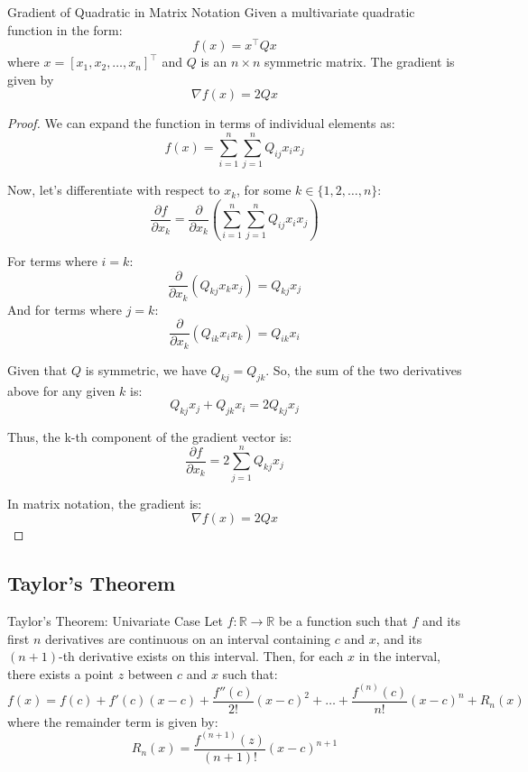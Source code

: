 \begin{lemma}{Gradient of Quadratic in Matrix Notation}{}
Given a multivariate quadratic function in the form:
\[ f(x) = x^\top Q x \]
where \( x = [x_1, x_2, \ldots, x_n]^\top \) and \( Q \) is an \( n \times n \) symmetric matrix. 
The gradient is given by
\[ \nabla f(x) = 2Qx \]

\end{lemma}
\begin{proof}
We can expand the function in terms of individual elements as:
\[ f(x) = \sum_{i=1}^{n} \sum_{j=1}^{n} Q_{ij} x_i x_j \]

Now, let's differentiate with respect to \( x_k \), for some \( k \in \{1, 2, \ldots, n\} \):
\[ \frac{\partial f}{\partial x_k} = \frac{\partial}{\partial x_k} \left( \sum_{i=1}^{n} \sum_{j=1}^{n} Q_{ij} x_i x_j \right) \]

For terms where \( i = k \):
\[ \frac{\partial}{\partial x_k} (Q_{kj} x_k x_j) = Q_{kj} x_j \]
And for terms where \( j = k \):
\[ \frac{\partial}{\partial x_k} (Q_{ik} x_i x_k) = Q_{ik} x_i \]

Given that \( Q \) is symmetric, we have \( Q_{kj} = Q_{jk} \). So, the sum of the two derivatives above for any given \( k \) is:
\[ Q_{kj} x_j + Q_{jk} x_i = 2Q_{kj} x_j \]

Thus, the k-th component of the gradient vector is:
\[ \frac{\partial f}{\partial x_k} = 2 \sum_{j=1}^{n} Q_{kj} x_j \]

In matrix notation, the gradient is:
\[ \nabla f(x) = 2Qx \]
\end{proof}


\subsection{Taylor's Theorem}

\begin{theorem}{Taylor's Theorem: Univariate Case}{}
Let \( f: \mathbb{R} \rightarrow \mathbb{R} \) be a function such that \( f \) and its first \( n \) derivatives are continuous on an interval containing \( c \) and \( x \), and its \( (n+1) \)-th derivative exists on this interval. Then, for each \( x \) in the interval, there exists a point \( z \) between \( c \) and \( x \) such that:
\[ 
f(x) = f(c) + f'(c)(x-c) + \frac{f''(c)}{2!}(x-c)^2 + \dots + \frac{f^{(n)}(c)}{n!}(x-c)^n + R_n(x)
\]
where the remainder term is given by:
\[ 
R_n(x) = \frac{f^{(n+1)}(z)}{(n+1)!}(x-c)^{n+1}
\]
\end{theorem}

